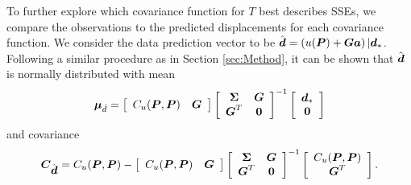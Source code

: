 \documentclass[extra,mreferee]{gji}
\begin{document}
To further explore which covariance function for $T$ best describes SSEs, we compare the observations to the predicted displacements for each covariance function. We consider the data prediction vector to be $\hat{\mitbf{d}} = \left(u(\mitbf{P}) + \mitbf{G}\mitbf{a}\right)|\mitbf{d}_*$. Following a similar procedure as in Section \ref{sec:Method}, it can be shown that $\hat{\mitbf{d}}$ is normally distributed with mean 
\begin{equation}\label{eq:DataPredMean}
\mitbf{\mu}_{\hat{d}} = \left[\begin{array}{cc}
                           C_u(\mitbf{P},\mitbf{P}) & \mitbf{G} \\
                           \end{array}\right]
                     \left[\begin{array}{cc}
                           \mitbf{\Sigma} & \mitbf{G} \\
                           \mitbf{G}^T  & \mitbf{0} \\
                           \end{array}\right]^{-1}
                     \left[\begin{array}{c}
                           \mitbf{d}_* \\
                           \mitbf{0} \\
                           \end{array}\right]
\end{equation}  
and covariance
\begin{equation}\label{eq:DataPredCov}
\mitbf{C}_{\hat{\mitbf{d}}} = C_u(\mitbf{P},\mitbf{P}) - 
                        \left[\begin{array}{cc}
                              C_u(\mitbf{P},\mitbf{P}) & \mitbf{G} \\
                              \end{array}\right]
                        \left[\begin{array}{cc}
                              \mitbf{\Sigma} & \mitbf{G} \\
                              \mitbf{G}^T  & \mitbf{0} \\
                              \end{array}\right]^{-1}
                        \left[\begin{array}{c}
                              C_u(\mitbf{P},\mitbf{P}) \\
                              \mitbf{G}^T \\
                              \end{array}\right].
\end{equation}
\end{document}
